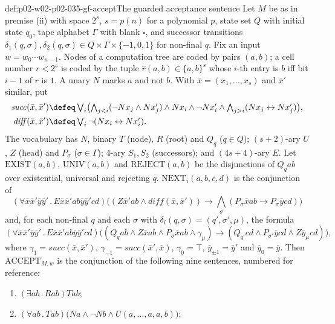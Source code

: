 \begin{hbdefinition}{def:p02-w02-p02-035-gf-accept}{The guarded acceptance sentence}
Let \(M\) be as in premise (ii) with space \(2^{s}\), \(s=p(n)\) for a
polynomial \(p\), state set \(Q\) with initial state \(q_0\), tape alphabet
\(\Gamma\) with blank \(\square\), and successor transitions
\(\delta_1(q,\sigma),\delta_2(q,\sigma)\in Q\times\Gamma\times\{-1,0,1\}\) for
non-final \(q\).  Fix an input \(w=w_0\cdots w_{n-1}\).  Nodes of a
computation tree are coded by pairs \((a,b)\); a cell number \(r<2^{s}\) is
coded by the tuple \(\hat r(a,b)\in\{a,b\}^{s}\) whose \(i\)-th entry is \(b\)
iff bit \(i-1\) of \(r\) is \(1\).  A unary \(N\) marks \(a\) and not \(b\).
With \(\bar x=(x_1,\ldots,x_s)\) and \(\bar x'\) similar, put
\[
\begin{aligned}
 \mathit{succ}(\bar x,\bar x')&\defeq\textstyle\bigvee_{i}\bigl(
   \bigwedge_{j<i}(\neg Nx_j\land Nx'_j)\land Nx_i\land\neg Nx'_i\land
   \bigwedge_{j>i}(Nx_j\leftrightarrow Nx'_j)\bigr),\\
 \mathit{diff}(\bar x,\bar x')&\defeq\textstyle\bigvee_{i}\neg(Nx_i\leftrightarrow Nx'_i).
\end{aligned}
\]
The vocabulary has \(N\), binary \(T\) (node), \(R\) (root) and \(Q_q\)
(\(q\in Q\)); \((s+2)\)-ary \(U\), \(Z\) (head) and \(P_\sigma\)
(\(\sigma\in\Gamma\)); \(4\)-ary \(S_1,S_2\) (successors); and \((4s+4)\)-ary
\(E\).  Let \(\mathrm{EXIST}(a,b)\), \(\mathrm{UNIV}(a,b)\) and
\(\mathrm{REJECT}(a,b)\) be the disjunctions of \(Q_qab\) over existential,
universal and rejecting \(q\).  \(\mathrm{NEXT}_i(a,b,c,d)\) is the
conjunction of
\[
 (\forall\bar x\bar x'\bar y\bar y'\,.\,E\bar x\bar x'ab\bar y\bar y'cd)
 \bigl((Z\bar x'ab\land\mathit{diff}(\bar x,\bar x'))\to
 \textstyle\bigwedge_{\sigma}(P_\sigma\bar xab\to P_\sigma\bar ycd)\bigr)
\]
and, for each non-final \(q\) and each \(\sigma\) with
\(\delta_i(q,\sigma)=(q',\sigma',\mu)\), the formula
\[
 (\forall\bar x\bar x'\bar y\bar y'\,.\,E\bar x\bar x'ab\bar y\bar y'cd)
 \bigl((Q_qab\land Z\bar xab\land P_\sigma\bar xab\land\gamma_\mu)\to
 (Q_{q'}cd\land P_{\sigma'}\bar ycd\land Z\bar y_\mu cd)\bigr),
\]
where
\(\gamma_1=\mathit{succ}(\bar x,\bar x')\), \(\gamma_{-1}=\mathit{succ}(\bar x',\bar x)\),
\(\gamma_0=\top\), \(\bar y_{\pm1}=\bar y'\) and \(\bar y_0=\bar y\).  Then
\(\mathrm{ACCEPT}_{M,w}\) is the conjunction of the following nine
sentences, numbered for reference:
\begin{enumerate}
\item \((\exists ab\,.\,Rab)Tab\);
\item \((\forall ab\,.\,Tab)\bigl(Na\land\neg Nb\land U(a,\ldots,a,a,b)\bigr)\);

\end{enumerate}
\end{hbdefinition}

